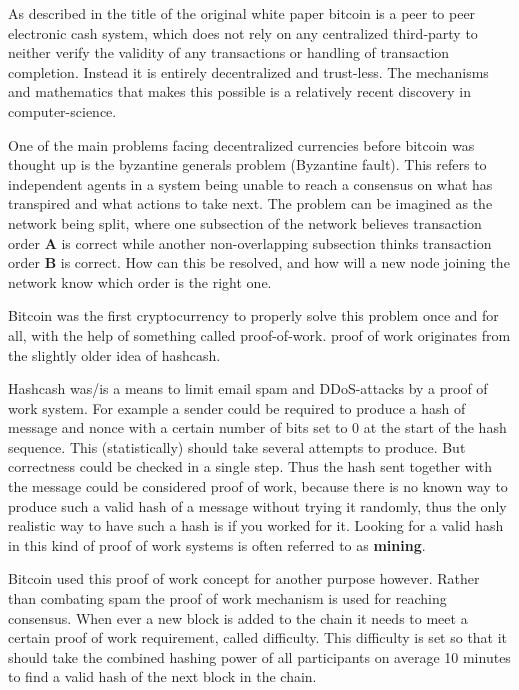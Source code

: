 As described in the title of the original white paper bitcoin is a peer to peer electronic cash system, which does not rely on any centralized third-party to neither verify the validity of any transactions or handling of transaction completion. Instead it is entirely decentralized and trust-less. The mechanisms and mathematics that makes this possible is a relatively recent discovery in computer-science. 


One of the main problems facing decentralized currencies before bitcoin was thought up is the byzantine generals problem (Byzantine fault). This refers to independent agents in a system being unable to reach a consensus on what has transpired and what actions to take next. The problem can be imagined as the network being split, where one subsection of the network believes transaction order \textbf{A} is correct while another non-overlapping subsection thinks transaction order \textbf{B} is correct. How can this be resolved, and how will a new node joining the network know which order is the right one.

Bitcoin was the first cryptocurrency to properly solve this problem once and for all, with the help of something called proof-of-work. proof of work originates from the slightly older idea of hashcash. 

Hashcash was/is a means to limit email spam and DDoS-attacks by a proof of work system. For example a sender could be required to produce a hash of message and nonce with a certain number of bits set to 0 at the start of the hash sequence. This (statistically) should take several attempts to produce. But correctness could be checked in a single step. Thus the hash sent together with the message could be considered proof of work, because there is no known way to produce such a valid hash of a message without trying it randomly, thus the only realistic way to have such a hash is if you worked for it. Looking for a valid hash in this kind of proof of work systems is often referred to as \textbf{mining}.

Bitcoin used this proof of work concept for another purpose however. Rather than combating spam the proof of work mechanism is used for reaching consensus. When ever a new block is added to the chain it needs to meet a certain proof of work requirement, called difficulty. This difficulty is set so that it should take the combined hashing power of all participants on average 10 minutes to find a valid hash of the next block in the chain.

